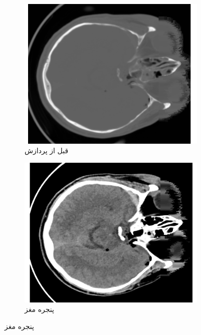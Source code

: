 \begin{figure}[h!]
    \centering %
    \begin{subfigure}{0.33\textwidth}
      \includegraphics[width=\linewidth]{Images/chapter2/before_processing_no_caption.png}
      \caption{قبل از پردازش}
      \label{fig:ch2-before-processing}
    \end{subfigure}\hfil %
    \begin{subfigure}{0.33\textwidth}
      \includegraphics[width=\linewidth]{Images/chapter2/brain_window_no_caption.png}
      \caption{پنجره مغز}
      \label{fig:ch2-brain-window}

\end{subfigure}
\end{figure}
